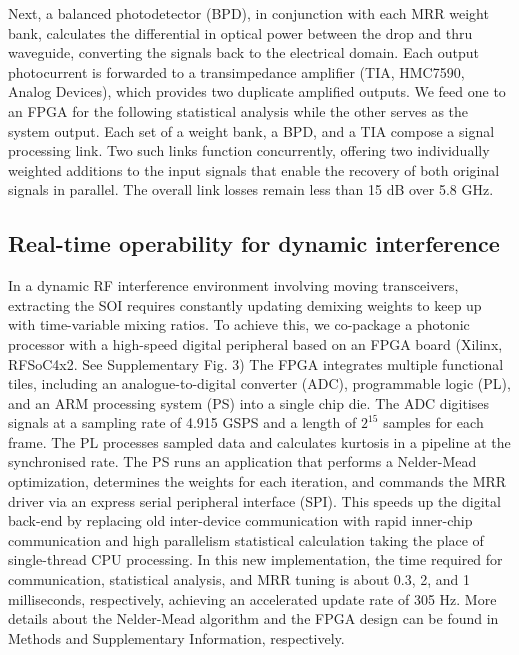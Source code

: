 \documentclass[pdflatex,mathphys]{sty}%
\begin{document}
Next, a balanced photodetector (BPD), in conjunction with each MRR weight bank, calculates the differential in optical power between the drop and thru waveguide, converting the signals back to the electrical domain. Each output photocurrent is forwarded to a transimpedance amplifier (TIA, HMC7590, Analog Devices), which provides two duplicate amplified outputs. We feed one to an FPGA for the following statistical analysis while the other serves as the system output. Each set of a weight bank, a BPD, and a TIA compose a signal processing link. Two such links function concurrently, offering two individually weighted additions to the input signals that enable the recovery of both original signals in parallel. The overall link losses remain less than 15 dB over 5.8 GHz.

\subsection{Real-time operability for dynamic interference}

In a dynamic RF interference environment involving moving transceivers, extracting the SOI requires constantly updating demixing weights to keep up with time-variable mixing ratios. To achieve this, we co-package a photonic processor with a high-speed digital peripheral based on an FPGA board (Xilinx, RFSoC4x2. See Supplementary Fig. 3) The FPGA integrates multiple functional tiles, including an analogue-to-digital converter (ADC), programmable logic (PL), and an ARM processing system (PS) into a single chip die. The ADC digitises signals at a sampling rate of 4.915 GSPS and a length of $2^{15}$ samples for each frame. The PL processes sampled data and calculates kurtosis in a pipeline at the synchronised rate. The PS runs an application that performs a Nelder-Mead optimization, determines the weights for each iteration, and commands the MRR driver via an express serial peripheral interface (SPI). This speeds up the digital back-end by replacing old inter-device communication with rapid inner-chip communication and high parallelism statistical calculation taking the place of single-thread CPU processing. In this new implementation, the time required for communication, statistical analysis, and MRR tuning is about 0.3, 2, and 1 milliseconds, respectively, achieving an accelerated update rate of 305 Hz. More details about the Nelder-Mead algorithm and the FPGA design can be found in Methods and Supplementary Information, respectively.
\end{document}
